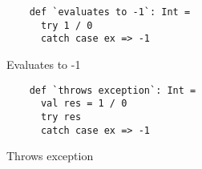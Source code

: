 % 
%  
% 



\begin{algorithm}
    \begin{minipage}{0.40\textwidth}
    \begin{verbatim}
    def `evaluates to -1`: Int =
      try 1 / 0
      catch case ex => -1
    \end{verbatim}
    \caption{Evaluates to -1}
    \end{minipage}
    \hspace{0.05\textwidth}
    \begin{minipage}{0.40\textwidth}
    \vspace{0.05\textwidth}
    \begin{verbatim}
    def `throws exception`: Int =
      val res = 1 / 0
      try res
      catch case ex => -1
    \end{verbatim}
    \caption{Throws exception}
    \end{minipage}

    \caption{Throwing exceptions breaks referential transparency %
    \label{rt:exceptions}}
\end{algorithm}